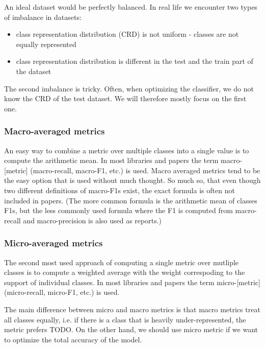 An ideal dataset would be perfectly balanced. In real life we encounter two types of imbalance in datasets:

\begin{itemize}
\item class representation distribution (CRD) is not uniform - classes are not equally represented 

\item class representation distribution is different in the test and the train part of the dataset
\end{itemize}
The second imbalance is tricky. Often, when optimizing the classifier, we do not know the CRD of the test dataset. We will therefore mostly focus on the first one. 


\subsubsection{Macro-averaged metrics}

An easy way to combine a metric over multiple classes into a single value is to compute the arithmetic mean. In most libraries and papers the term macro-[metric] (macro-recall, macro-F1, etc.) is used.  Macro averaged metrics tend to be the easy option that is used without much thought. So much so, that even though two different definitions of macro-F1s exist, the exact formula is often not included in papers. (The more common formula is the arithmetic mean of classes F1s, but the less commonly used formula where the F1 is computed from macro-recall and macro-precision is also used as  \cite{Opitz2019MacroFA} reports.)

\subsubsection{Micro-averaged metrics}
The second most used approach of computing a single metric over mutliple classes is to compute a weighted average with the weight correspoding to the support of individual classes. In most libraries and papers the term micro-[metric] (micro-recall, micro-F1, etc.) is used. 

The main difference between micro and macro metrics is that macro metrics treat all classes equally, i.e. if there is a class that is heavily under-represented, the metric prefers TODO. On the other hand, we should use micro metric if we want to optimize the total accuracy of the model. 


